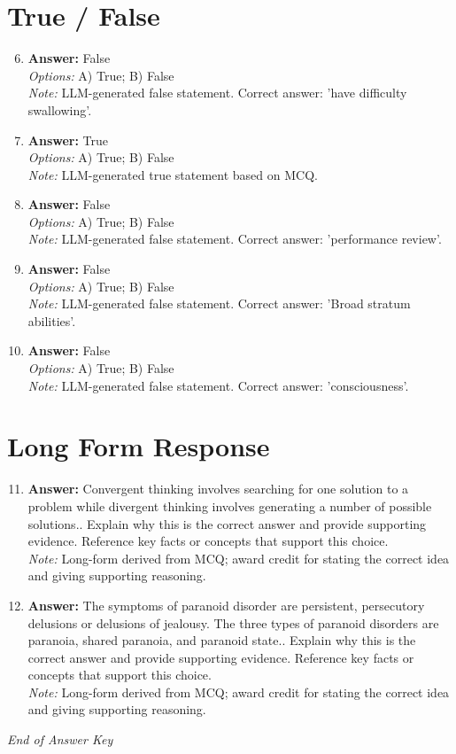 \documentclass[12pt]{article}
\begin{document}
\section*{True / False}
\begin{enumerate}[label=\arabic*.]
\setcounter{enumi}{5}
\item \textbf{Answer:} False
\\ \textit{Options:} A) True; B) False
\\ \textit{Note:} LLM-generated false statement. Correct answer: 'have difficulty swallowing'.
\item \textbf{Answer:} True
\\ \textit{Options:} A) True; B) False
\\ \textit{Note:} LLM-generated true statement based on MCQ.
\item \textbf{Answer:} False
\\ \textit{Options:} A) True; B) False
\\ \textit{Note:} LLM-generated false statement. Correct answer: 'performance review'.
\item \textbf{Answer:} False
\\ \textit{Options:} A) True; B) False
\\ \textit{Note:} LLM-generated false statement. Correct answer: 'Broad stratum abilities'.
\item \textbf{Answer:} False
\\ \textit{Options:} A) True; B) False
\\ \textit{Note:} LLM-generated false statement. Correct answer: 'consciousness'.
\end{enumerate}

\section*{Long Form Response}
\begin{enumerate}[label=\arabic*.]
\setcounter{enumi}{10}
\item \textbf{Answer:} Convergent thinking involves searching for one solution to a problem while divergent thinking involves generating a number of possible solutions.. Explain why this is the correct answer and provide supporting evidence. Reference key facts or concepts that support this choice.
\\ \textit{Note:} Long-form derived from MCQ; award credit for stating the correct idea and giving supporting reasoning.
\item \textbf{Answer:} The symptoms of paranoid disorder are persistent, persecutory delusions or delusions of jealousy. The three types of paranoid disorders are paranoia, shared paranoia, and paranoid state.. Explain why this is the correct answer and provide supporting evidence. Reference key facts or concepts that support this choice.
\\ \textit{Note:} Long-form derived from MCQ; award credit for stating the correct idea and giving supporting reasoning.
\end{enumerate}

\vfill
\noindent\textit{End of Answer Key}
\end{document}
